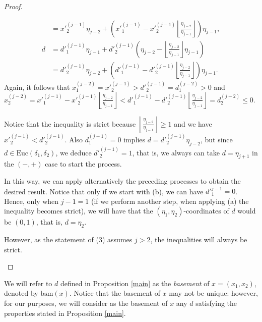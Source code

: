 \documentclass[11pt]{amsart}
\theoremstyle{remark}
\newcommand{\peb}[1]{\left\lfloor {#1}\right\rfloor}
\begin{document}
\begin{proof}
\begin{enumerate}[(1)]
\begin{enumerate}
\[\begin{aligned}
       	        & = x'^{(j-1)}_2\eta_{j-2}+\left(x'^{(j-1)}_1-x'^{(j-1)}_2\peb{\tfrac{\eta_{j-2}}{\eta_{j-1}}}\right )\eta_{j-1}, \\
       	     d  & =   d'^{(j-1)}_1\eta_{j-1}+d'^{(j-1)}_2\left(\eta_{j-2}-\peb{\tfrac{\eta_{j-2}}{\eta_{j-1}}}\eta_{j-1}\right ) \\
       	     & = d'^{(j-1)}_2\eta_{j-2}+\left (d'^{(j-1)}_1-d'^{(j-1)}_2\peb{\tfrac{\eta_{j-2}}{\eta_{j-1}}}\right )\eta_{j-1}. 
       	     \end{aligned}
       	     \]
       	     Again, it follows that  $x^{(j-2)}_1=x'^{(j-1)}_2>d'^{(j-1)}_2=d^{(j-2)}_1>0$ and $x^{(j-2)}_2= x'^{(j-1)}_1-x'^{(j-1)}_2\peb{\tfrac{\eta_{j-2}}{\eta_{j-1}}}<d'^{(j-1)}_1-d'^{(j-1)}_2\peb{\tfrac{\eta_{j-2}}{\eta_{j-1}}}=d^{(j-2)}_2\le 0$.
       	  \end{enumerate}
Notice that the inequality is strict because $\peb{\frac{\eta_{j-2}}{\eta_{j-1}}}\ge 1$ and we have $x'^{(j-1)}_2<d'^{(j-1)}_2$. Also $d^{(j-1)}_1=0$ implies $d=d'^{(j-1)}_2\eta_{j-2}$, but since $d\in \mathrm {Euc}(\delta_1,\delta_2)$, we deduce $d'^{(j-1)}_2=1$, that is, we always can take $d=\eta_{j+1}$ in the $(-,+)$ case to start the process.
       	  
In this way, we can apply alternatively the preceding processes to obtain the desired result. Notice that only if we start with (b), we can have $d'^{j-1}_1=0$. Hence, only when $j-1=1$ (if we perform another step, when applying (a) the inequality becomes strict), we will have that the $(\eta_1,\eta_2)$-coordinates of $d$ would be  $(0,1)$, that is, $d=\eta_2$.
       	  
However, as the statement of (3) assumes $j>2$, the inequalities will always be strict.\qedhere
 \end{enumerate}
\end{proof}

We will refer to $d$ defined in Proposition \ref{main} as the \emph{basement} of $x=(x_1,x_2)$, denoted by $\mathrm{bsm}(x)$. Notice that the basement of $x$ may not be unique: however, for our purposes, we will consider as the basement of $x$ any $d$ satisfying the properties stated in Proposition \ref{main}. 
\end{document}
